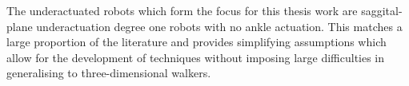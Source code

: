 The underactuated robots which form the focus for this thesis work are saggital-plane underactuation degree one robots with no ankle actuation. This matches a large proportion of the literature and provides simplifying assumptions which allow for the development of techniques without imposing large difficulties in generalising to three-dimensional walkers. %
